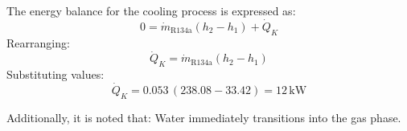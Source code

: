 The energy balance for the cooling process is expressed as:  
\[
0 = \dot{m}_{\text{R134a}} (h_2 - h_1) + \dot{Q}_K
\]
Rearranging:  
\[
\dot{Q}_K = \dot{m}_{\text{R134a}} (h_2 - h_1)
\]
Substituting values:  
\[
\dot{Q}_K = 0.053 \, (238.08 - 33.42) = 12 \, \text{kW}
\]

Additionally, it is noted that:  
Water immediately transitions into the gas phase.